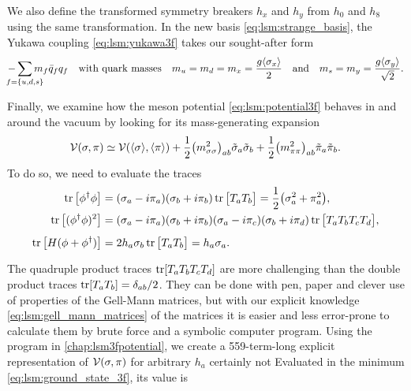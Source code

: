 We also define the transformed symmetry breakers $h_x$ and $h_y$ from $h_0$ and $h_8$ using the same transformation.
In the new basis \eqref{eq:lsm:strange_basis}, the Yukawa coupling \eqref{eq:lsm:yukawa3f} takes our sought-after form
\begin{equation}
	- \smashoperator{\sum_{f=\{u,d,s\}}} m_f \bar{q}_f q_f
	\quad \text{with quark masses} \quad
	m_u = m_d = m_x = \frac{g \avg{\sigma_x}}{2}
	\quad \text{and} \quad
	m_s = m_y = \frac{g \avg{\sigma_y}}{\sqrt{2}}.
\label{eq:lsm:quark_masses_3f}
\end{equation}

Finally, we examine how the meson potential \eqref{eq:lsm:potential3f} behaves in and around the vacuum
by looking for its mass-generating expansion
\begin{equation}
	\mathcal{V}(\sigma,\pi) \simeq \mathcal{V}(\langle \sigma \rangle,\langle \pi \rangle) + \frac12 \big(m^2_{\sigma\sigma}\big)_{ab} \tilde{\sigma}_a \tilde{\sigma}_b + \frac12 \big(m^2_{\pi\pi}\big)_{ab} \tilde{\pi}_a \tilde{\pi}_b.
\label{eq:lsm3f:potential_before_diagonalization}
\end{equation}
To do so, we need to evaluate the traces
\begin{subequations}
\begin{align}
	\operatorname{tr}\big[\phi^\dagger \phi\big]     &= (\sigma_a - i \pi_a) (\sigma_b + i \pi_b) \operatorname{tr} \big[ T_a T_b \big] = \frac12 \big(\sigma_a^2+\pi_a^2\big) , \\
	\operatorname{tr}\big[(\phi^\dagger \phi)^2\big] &= (\sigma_a - i \pi_a) (\sigma_b + i \pi_b) (\sigma_a - i \pi_c) (\sigma_b + i \pi_d) \operatorname{tr} \big[ T_a T_b T_c T_d \big], \\
	\operatorname{tr}\big[H(\phi+\phi^\dagger)\big]  &= 2 h_a \sigma_b \operatorname{tr} \big[ T_a T_b \big] = \vphantom{\frac12} h_a \sigma_a . \label{eq:lsm3f:traces_hphi}
\end{align}%
\label{eq:lsm3f:traces}%
\end{subequations}%
The quadruple product traces $\operatorname{tr}[T_a T_b T_c T_d]$ are more challenging than the double product traces $\operatorname{tr}[T_a T_b] = \delta_{ab}/2$.
They can be done with pen, paper and clever use of properties of the Gell-Mann matrices,
but with our explicit knowledge \eqref{eq:lsm:gell_mann_matrices} of the matrices
it is easier and less error-prone to calculate them by brute force and a symbolic computer program.
Using the program in \cref{chap:lsm3fpotential},
we create a 559-term-long explicit representation of $\mathcal{V}(\sigma,\pi)$ for arbitrary $h_a$ certainly not 
Evaluated in the minimum \eqref{eq:lsm:ground_state_3f}, its value is
